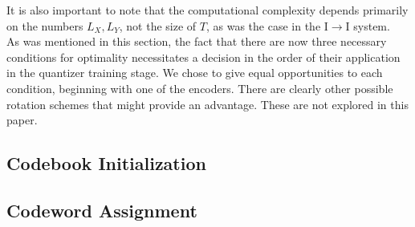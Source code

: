 \documentclass[10pt]{article}
\begin{document}
It is also important to note that the computational complexity depends primarily on the numbers $L_X, L_Y$, not the size of $T$, as was the case in the I$\rightarrow$I system.\\

As was mentioned in this section, the fact that there are now three necessary conditions for optimality necessitates a decision in the order of their application in the quantizer training stage. We chose to give equal opportunities to each condition, beginning with one of the encoders. There are clearly other possible rotation schemes that might provide an advantage. These are not explored in this paper.





\subsection{Codebook Initialization}



\subsection{Codeword Assignment}
\end{document}
